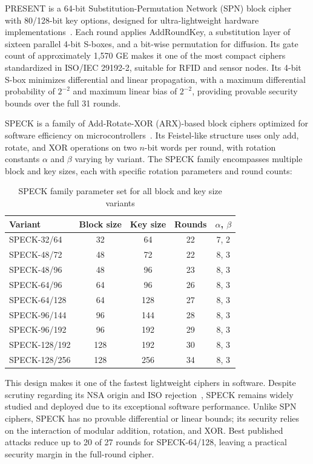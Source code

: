 \documentclass[12pt]{report}
\begin{document}
PRESENT is a 64-bit Substitution-Permutation Network (SPN) block cipher with 80/128-bit key options, designed for ultra-lightweight
hardware implementations~\cite{bogdanov2007present}. Each round applies AddRoundKey, a
substitution layer of sixteen parallel 4-bit S-boxes, and a bit-wise permutation for diffusion.
Its gate count of approximately 1,570 GE makes it one of the most compact ciphers
standardized in ISO/IEC 29192-2, suitable for RFID and sensor nodes.
Its 4-bit S-box minimizes differential and linear propagation, with a
maximum differential probability of $2^{-2}$ and maximum linear bias of
$2^{-2}$, providing provable security bounds over the full 31 rounds.

SPECK is a family of Add-Rotate-XOR (ARX)-based block ciphers optimized for software efficiency on
microcontrollers~\cite{beaulieu2015simon}. Its Feistel-like structure uses only add, rotate,
and XOR operations on two $n$-bit words per round, with rotation constants $\alpha$ and
$\beta$ varying by variant. The SPECK family encompasses multiple block and key sizes,
each with specific rotation parameters and round counts:

\begin{table}[H]
    \centering
    \begin{tabular}{lcccc}
        \toprule
        \textbf{Variant} & \textbf{Block size} & \textbf{Key size} & \textbf{Rounds} & \textbf{$\alpha$, $\beta$} \\
        \midrule
         SPECK-32/64 & 32 & 64 & 22 & 7, 2 \\
         SPECK-48/72 & 48 & 72 & 22 & 8, 3 \\
         SPECK-48/96 & 48 & 96 & 23 & 8, 3 \\
         SPECK-64/96 & 64 & 96 & 26 & 8, 3 \\
         SPECK-64/128 & 64 & 128 & 27 & 8, 3 \\
         SPECK-96/144 & 96 & 144 & 28 & 8, 3 \\
         SPECK-96/192 & 96 & 192 & 29 & 8, 3 \\
         SPECK-128/192 & 128 & 192 & 30 & 8, 3 \\
         SPECK-128/256 & 128 & 256 & 34 & 8, 3 \\
        \bottomrule
    \end{tabular}
    \caption{SPECK family parameter set for all block and key size variants}
    \label{tab:speck-params}
\end{table}

This design makes it one of the fastest lightweight ciphers in software. Despite
scrutiny regarding its NSA origin and ISO rejection~\cite{ashur2018simon}, SPECK remains
widely studied and deployed due to its exceptional software performance.
Unlike SPN ciphers, SPECK has no provable differential or linear bounds;
its security relies on the interaction of modular addition, rotation, and
XOR. Best published attacks reduce up to 20 of 27 rounds for SPECK-64/128,
leaving a practical security margin in the full-round cipher.
\end{document}
